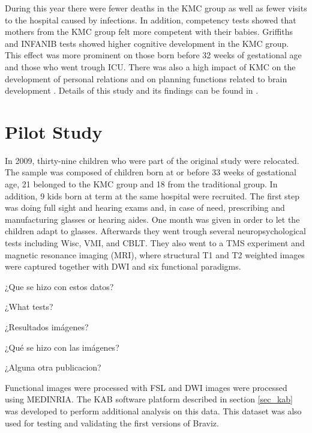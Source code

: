 During this year there were fewer deaths in the KMC group as well as fewer visits to the hospital caused by infections. In addition, competency tests showed that mothers from the KMC group felt more competent with their babies. Griffiths and INFANIB tests showed higher cognitive development in the KMC group. This effect was more prominent on those born before 32 weeks of gestational age and those who went trough ICU. There was also a high impact of KMC on the development of personal relations and on planning functions related to brain development \autocite{tessier_kangaroo_2003}. Details of this study and its findings can be found in \autocite{charpak_current_1996,charpak_kangaroo_1997,charpak_randomized_2001,charpak_kangaroo_2005}.



\section{Pilot Study}


In 2009, thirty-nine children who were part of the original study were relocated. The sample was composed of children born at or before 33 weeks of gestational age, 21 belonged to the KMC group and 18 from the traditional group. In addition, 9 kids born at term at the same hospital were recruited. 
The first step was doing full sight and hearing exams and, in case of need, prescribing and manufacturing glasses or hearing aides. One month was given in order to let the children adapt to glasses. Afterwards they went trough several neuropsychological tests including Wisc\autocite{WISC}, VMI\autocite{VMI}, and CBLT\autocite{CBLT}. They also went to a TMS experiment and magnetic resonance imaging (MRI), where structural T1 and T2 weighted images were captured together with DWI and six functional paradigms. 

¿Que se hizo con estos datos?

¿What tests?

¿Resultados imágenes?

¿Qué se hizo con las imágenes?

¿Alguna otra publicacion?


Functional images were processed with FSL and DWI images were processed using MEDINRIA. The KAB software platform described in section \ref{sec_kab} was developed to perform additional analysis on this data. This dataset was also used for testing and validating the first versions of Braviz.

